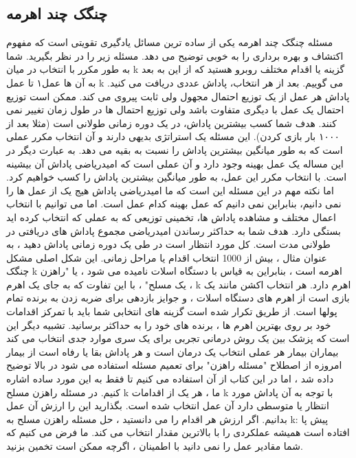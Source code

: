 \subsection{چنگک چند اهرمه}

مسئله چنگک چند اهرمه یکی از ساده ترین مسائل یادگیری تقویتی است که مفهوم اکتشاف و بهره برداری را به خوبی توضیح می دهد. مسئله زیر را در نظر بگیرید. شما به طور مکرر با انتخاب در میان k گزینه یا اقدام مختلف روبرو هستید که از این به بعد به آن ها عمل۱ تا عمل k می گوییم. بعد از هر انتخاب، پاداش عددی دریافت می کنید. پاداش هر عمل از یک توزیع احتمال مجهول ولی ثابت پیروی می کند. ممکن است توزیع احتمال یک عمل با دیگری متفاوت باشد ولی توزیع احتمال ها در طول زمان تغییر نمی کنند. هدف شما کسب بیشترین پاداش، در یک دوره زمانی طولانی است (مثلا بعد از ۱۰۰۰ بار بازی کردن). این مسئله یک استراتژی بدیهی دارند و آن انتخاب مکرر عملی است که به طور میانگین بیشترین پاداش را نسبت به بقیه می دهد. به عبارت دیگر در این مساله یک عمل بهینه وجود دارد و آن عملی است که امیدریاضی پاداش آن بیشینه است. با انتخاب مکرر این عمل، به طور میانگین بیشترین پاداش را کسب خواهیم کرد. اما نکته مهم در این مسئله این است که ما امیدریاضی پاداش هیج یک از عمل ها را نمی دانیم، بنابراین نمی دانیم که عمل بهینه کدام عمل است. اما می توانیم با انتخاب اعمال مختلف و مشاهده پاداش ها، تخمینی
توزیعی که به عملی که انتخاب کرده اید بستگی دارد. هدف شما به حداکثر رساندن امیدریاضی مجموع پاداش های دریافتی در طولانی مدت است. کل مورد انتظار است
در طی یک دوره زمانی پاداش دهید ، به عنوان مثال ، بیش از 1000 انتخاب اقدام یا مراحل زمانی.
این شکل اصلی مشکل چنگک k اهرمه است ، بنابراین به قیاس با دستگاه اسلات نامیده می شود ، یا
"راهزن یک مسلح" ، با این تفاوت که به جای یک اهرم ، k اهرم دارد. هر انتخاب اکشن مانند یک بازی است
از اهرم های دستگاه اسلات ، و جوایز بازدهی برای ضربه زدن به برنده تمام پولها است. از طریق تکرار شده است
گزینه های انتخابی شما باید با تمرکز اقدامات خود بر روی بهترین اهرم ها ، برنده های خود را به حداکثر برسانید.
تشبیه دیگر این است که پزشک بین یک روش درمانی تجربی برای یک سری موارد جدی انتخاب می کند
بیماران بیمار هر عملی انتخاب یک درمان است و هر پاداش بقا یا رفاه است
از بیمار امروزه از اصطلاح "مسئله راهزن" برای تعمیم مسئله استفاده می شود
در بالا توضیح داده شد ، اما در این کتاب از آن استفاده می کنیم تا فقط به این مورد ساده اشاره کنیم.
در مسئله راهزن مسلح k ما ، هر یک از اقدامات k با توجه به آن پاداش مورد انتظار یا متوسطی دارد
آن عمل انتخاب شده است. بگذارید این را ارزش آن عمل بدانیم.
اگر ارزش هر اقدام را می دانستید ، حل مسئله راهزن مسلح به k: پیش پا افتاده است
همیشه عملکردی را با بالاترین مقدار انتخاب می کند. ما فرض می کنیم که شما مقادیر عمل را نمی دانید
با اطمینان ، اگرچه ممکن است تخمین بزنید.

